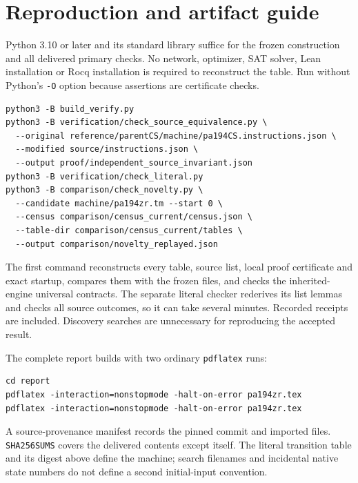 \documentclass[11pt,letterpaper]{article}
\newcommand{\file}[1]{\texttt{\nolinkurl{#1}}}
\begin{document}
\section{Reproduction and artifact guide}
\label{sec:reproduce}
Python 3.10 or later and its standard library suffice for the frozen
construction and all delivered primary checks. No network, optimizer,
SAT solver, Lean installation or Rocq installation is required to
reconstruct the table. Run without Python's \texttt{-O} option because
assertions are certificate checks.
\begin{verbatim}
python3 -B build_verify.py
python3 -B verification/check_source_equivalence.py \
  --original reference/parentCS/machine/pa194CS.instructions.json \
  --modified source/instructions.json \
  --output proof/independent_source_invariant.json
python3 -B verification/check_literal.py
python3 -B comparison/check_novelty.py \
  --candidate machine/pa194zr.tm --start 0 \
  --census comparison/census_current/census.json \
  --table-dir comparison/census_current/tables \
  --output comparison/novelty_replayed.json
\end{verbatim}
The first command reconstructs every table, source list, local proof
certificate and exact startup, compares them with the frozen files, and
checks the inherited-engine universal contracts. The separate literal
checker rederives its list lemmas and checks all source outcomes, so it
can take several minutes. Recorded receipts are included. Discovery
searches are unnecessary for reproducing the accepted result.

The complete report builds with two ordinary \texttt{pdflatex} runs:
\begin{verbatim}
cd report
pdflatex -interaction=nonstopmode -halt-on-error pa194zr.tex
pdflatex -interaction=nonstopmode -halt-on-error pa194zr.tex
\end{verbatim}
A source-provenance manifest records the pinned commit and imported
files. \file{SHA256SUMS} covers the delivered contents except itself.
The literal transition table and its digest above define the machine;
search filenames and incidental native state numbers do not define a
second initial-input convention.
\end{document}
